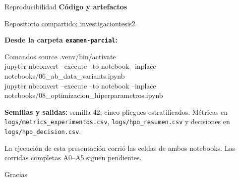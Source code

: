 \documentclass[aspectratio=169,10pt]{beamer}
\begin{document}
\begin{frame}{Reproducibilidad}
\small
\textbf{Código y artefactos}\par
\href{https://github.com/sanchezclases996/investigaciontesis2}{Repositorio compartido: investigaciontesis2}\par
\vspace{0.25cm}
\textbf{Desde la carpeta \texttt{examen-parcial}:}
\begin{block}{Comandos}
\ttfamily\small
source .venv/bin/activate\\
jupyter nbconvert --execute --to notebook --inplace notebooks/06\_ab\_data\_variants.ipynb\\
jupyter nbconvert --execute --to notebook --inplace notebooks/08\_optimizacion\_hiperparametros.ipynb
\end{block}
\textbf{Semillas y salidas:} semilla 42; cinco pliegues estratificados. Métricas en \texttt{logs/metrics\_experimentos.csv}, \texttt{logs/hpo\_resumen.csv} y decisiones en \texttt{logs/hpo\_decision.csv}.\par
\vspace{0.2cm}
\scriptsize La ejecución de esta presentación corrió las celdas de ambos notebooks. Las corridas completas A0–A5 siguen pendientes.
\end{frame}

\begin{frame}[plain]
\centering\vfill
{\color{white}\Huge Gracias}
\vfill
\end{frame}
\end{document}

